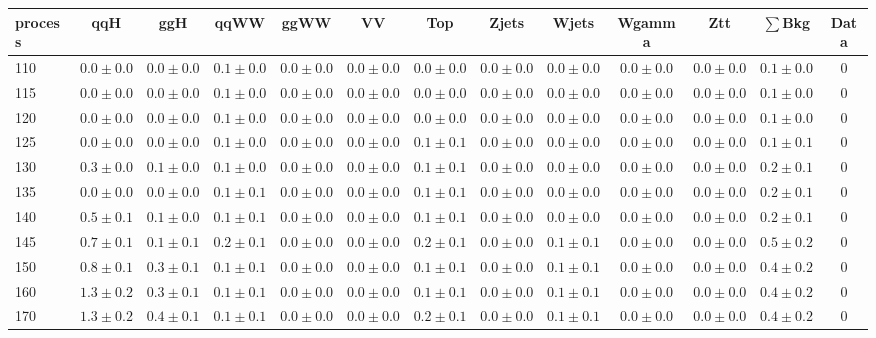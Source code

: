 \begin{table}
{%
 \tiny
 \begin{center}
 \begin{tabular}{l | c c | c c c c c c c c  | c c}
 \hline
 process & qqH & ggH & qqWW & ggWW & VV & Top & Zjets & Wjets & Wgamma & Ztt & $\sum$Bkg & Data \\
 \hline
110 & $0.0\pm0.0$ & $0.0\pm0.0$ & $0.1\pm0.0$ & $0.0\pm0.0$ & $0.0\pm0.0$ & $0.0\pm0.0$ & $0.0\pm0.0$ & $0.0\pm0.0$ & $0.0\pm0.0$ & $0.0\pm0.0$ & $0.1\pm0.0$ & 0 \\
115 & $0.0\pm0.0$ & $0.0\pm0.0$ & $0.1\pm0.0$ & $0.0\pm0.0$ & $0.0\pm0.0$ & $0.0\pm0.0$ & $0.0\pm0.0$ & $0.0\pm0.0$ & $0.0\pm0.0$ & $0.0\pm0.0$ & $0.1\pm0.0$ & 0 \\
120 & $0.0\pm0.0$ & $0.0\pm0.0$ & $0.1\pm0.0$ & $0.0\pm0.0$ & $0.0\pm0.0$ & $0.0\pm0.0$ & $0.0\pm0.0$ & $0.0\pm0.0$ & $0.0\pm0.0$ & $0.0\pm0.0$ & $0.1\pm0.0$ & 0 \\
125 & $0.0\pm0.0$ & $0.0\pm0.0$ & $0.1\pm0.0$ & $0.0\pm0.0$ & $0.0\pm0.0$ & $0.1\pm0.1$ & $0.0\pm0.0$ & $0.0\pm0.0$ & $0.0\pm0.0$ & $0.0\pm0.0$ & $0.1\pm0.1$ & 0 \\
130 & $0.3\pm0.0$ & $0.1\pm0.0$ & $0.1\pm0.0$ & $0.0\pm0.0$ & $0.0\pm0.0$ & $0.1\pm0.1$ & $0.0\pm0.0$ & $0.0\pm0.0$ & $0.0\pm0.0$ & $0.0\pm0.0$ & $0.2\pm0.1$ & 0 \\
135 & $0.0\pm0.0$ & $0.0\pm0.0$ & $0.1\pm0.1$ & $0.0\pm0.0$ & $0.0\pm0.0$ & $0.1\pm0.1$ & $0.0\pm0.0$ & $0.0\pm0.0$ & $0.0\pm0.0$ & $0.0\pm0.0$ & $0.2\pm0.1$ & 0 \\
140 & $0.5\pm0.1$ & $0.1\pm0.0$ & $0.1\pm0.1$ & $0.0\pm0.0$ & $0.0\pm0.0$ & $0.1\pm0.1$ & $0.0\pm0.0$ & $0.0\pm0.0$ & $0.0\pm0.0$ & $0.0\pm0.0$ & $0.2\pm0.1$ & 0 \\
145 & $0.7\pm0.1$ & $0.1\pm0.1$ & $0.2\pm0.1$ & $0.0\pm0.0$ & $0.0\pm0.0$ & $0.2\pm0.1$ & $0.0\pm0.0$ & $0.1\pm0.1$ & $0.0\pm0.0$ & $0.0\pm0.0$ & $0.5\pm0.2$ & 0 \\
150 & $0.8\pm0.1$ & $0.3\pm0.1$ & $0.1\pm0.1$ & $0.0\pm0.0$ & $0.0\pm0.0$ & $0.1\pm0.1$ & $0.0\pm0.0$ & $0.1\pm0.1$ & $0.0\pm0.0$ & $0.0\pm0.0$ & $0.4\pm0.2$ & 0 \\
160 & $1.3\pm0.2$ & $0.3\pm0.1$ & $0.1\pm0.1$ & $0.0\pm0.0$ & $0.0\pm0.0$ & $0.1\pm0.1$ & $0.0\pm0.0$ & $0.1\pm0.1$ & $0.0\pm0.0$ & $0.0\pm0.0$ & $0.4\pm0.2$ & 0 \\
170 & $1.3\pm0.2$ & $0.4\pm0.1$ & $0.1\pm0.1$ & $0.0\pm0.0$ & $0.0\pm0.0$ & $0.2\pm0.1$ & $0.0\pm0.0$ & $0.1\pm0.1$ & $0.0\pm0.0$ & $0.0\pm0.0$ & $0.4\pm0.2$ & 0 \\

\end{tabular}
\end{center}}
\end{table}
